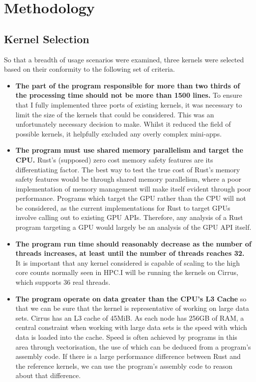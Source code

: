 \chapter{Methodology}\label{sec:meth}
\section{Kernel Selection}
So that a breadth of usage scenarios were examined, three kernels were selected based on their conformity to the following set of criteria.
\begin{itemize}
  \item \textbf{The part of the program responsible for more than two thirds of the processing time should not be more than 1500 lines.} To ensure that I fully implemented three ports of existing kernels, it was necessary to limit the size of the kernels that could be considered. This was an unfortunately necessary decision to make. Whilst it reduced the field of possible kernels, it helpfully excluded any overly complex mini-apps.

  \item \textbf{The program must use shared memory parallelism and target the CPU.} Rust's (supposed) zero cost memory safety features are its differentiating factor. The best way to test the true cost of Rust's memory safety features would be through shared memory parallelism, where a poor implementation of memory management will make itself evident through poor performance. Programs which target the GPU rather than the CPU will not be considered, as the current implementations for Rust to target GPUs involve calling out to existing GPU APIs. Therefore, any analysis of a Rust program targeting a GPU would largely be an analysis of the GPU API itself.

  \item \textbf{The program run time should reasonably decrease as the number of threads increases, at least until the number of threads reaches 32.} It is important that any kernel considered is capable of scaling to the high core counts normally seen in HPC.I will be running the kernels on Cirrus, which supports 36 real threads.

  \item \textbf{The program operate on data greater than the CPU's L3 Cache} so that we can be sure that the kernel is representative of working on large data sets. Cirrus has an L3 cache of 45MiB. As each node has 256GB of RAM, a central constraint when working with large data sets is the speed with which data is loaded into the cache. Speed is often achieved by programs in this area through vectorisation, the use of which can be deduced from a program's assembly code. If there is a large performance difference between Rust and the reference kernels, we can use the program's assembly code to reason about that difference.


\end{itemize}
